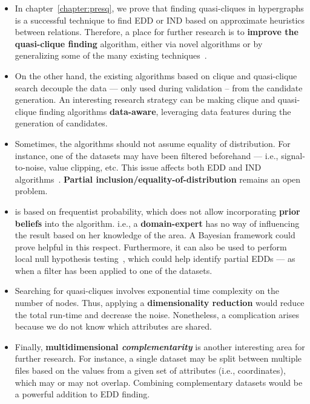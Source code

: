 \begin{itemize}
    \item In chapter~\ref{chapter:presq}, we prove that finding quasi-cliques in hypergraphs
    is a successful technique to find \gls{EDD} or \gls{IND} based on approximate heuristics
    between relations. Therefore, a place for further research is to
    \textbf{improve the quasi-clique finding} algorithm, either via novel algorithms or by
    generalizing some of the many existing techniques~\cite{WU2015693}.
            
    \item On the other hand, the existing algorithms based on clique and quasi-clique search
    decouple the data --- only used during validation -- from the candidate generation.
    An interesting research strategy can be making clique and quasi-clique finding algorithms \textbf{data-aware},
    leveraging data features during the generation of candidates.
    
    \item Sometimes, the algorithms should not assume equality of distribution. For instance, one of the
    datasets may have been filtered beforehand --- i.e., signal-to-noise, value clipping, etc. This issue affects
    both \gls{EDD} and \gls{IND} algorithms~\cite{koeller2003discovery}. \textbf{Partial inclusion/equality-of-distribution}
    remains an open problem.
            
    \item \PresQ is based on frequentist probability, which does not allow incorporating \textbf{prior beliefs}
    into the algorithm. i.e., a \textbf{domain-expert} has no way of influencing the result based
    on her knowledge of the area.
    A Bayesian framework could prove helpful in this respect. Furthermore,
    it can also be used to perform local null hypothesis testing~\cite{soriano2015bayesian}, which could help
    identify partial \glspl{EDD} --- as when a filter has been applied to one of the datasets.
    
    \item Searching for quasi-cliques involves exponential time complexity on the number of nodes.
    Thus, applying a \textbf{dimensionality reduction} would reduce the total
    run-time and decrease the noise. Nonetheless, a complication arises because
    we do not know which attributes are shared.
        
    \item Finally, \textbf{multidimensional \emph{complementarity}} is another interesting
    area for further research. For instance, a single dataset may be split between multiple files
    based on the values from a given set of attributes (i.e., coordinates), which may or may not overlap.
    Combining complementary datasets would be a powerful addition to \gls{EDD} finding.
\end{itemize}

